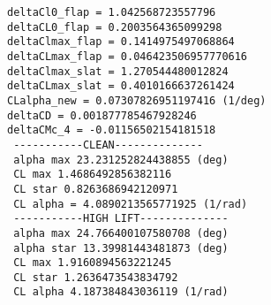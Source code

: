\bigskip
\lstset{language=Java}
\begin{lstlisting}[caption={B747-100B test results}, captionpos=b, tabsize=2]
deltaCl0_flap = 1.042568723557796
deltaCL0_flap = 0.2003564365099298
deltaClmax_flap = 0.1414975497068864
deltaCLmax_flap = 0.046423506957770616
deltaClmax_slat = 1.270544480012824
deltaCLmax_slat = 0.4010166637261424
CLalpha_new = 0.07307826951197416 (1/deg)
deltaCD = 0.001877785467928246
deltaCMc_4 = -0.01156502154181518
 -----------CLEAN-------------- 
 alpha max 23.231252824438855 (deg)
 CL max 1.4686492856382116
 CL star 0.8263686942120971
 CL alpha = 4.0890213565771925 (1/rad)
 -----------HIGH LIFT-------------- 
 alpha max 24.766400107580708 (deg)
 alpha star 13.39981443481873 (deg)
 CL max 1.9160894563221245
 CL star 1.2636473543834792
 CL alpha 4.187384843036119 (1/rad)
\end{lstlisting}
%
